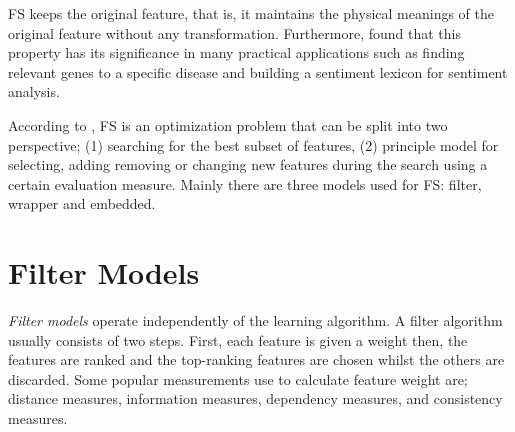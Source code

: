 

FS keeps the original feature, that is, it maintains the physical meanings of the original feature without any transformation. Furthermore, \citet{masaeli2010transformation} found that this property has its significance in many practical applications such as finding relevant genes to a specific disease and building a sentiment lexicon for sentiment analysis.

According to \citet{zhao2010advancing}, FS is an optimization problem that can be split into two perspective; (1) searching for the best subset of features, (2) principle model for selecting, adding removing or changing new features during the search using a certain evaluation measure. Mainly there are three models used for FS: filter, wrapper and embedded.

\section{Filter Models}\label{sec:fs_filter}
\textit{Filter models} operate independently of the learning algorithm. A filter algorithm usually consists of two steps. First, each feature is given a weight then, the features are ranked and the top-ranking features are chosen whilst the others are discarded. Some popular measurements use to calculate feature weight are; distance measures, information measures, dependency measures, and consistency measures.

